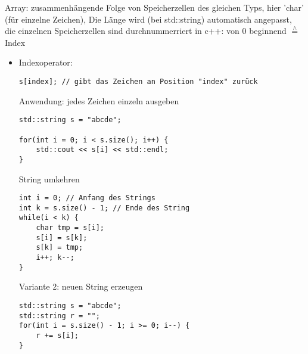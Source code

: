 \documentclass[a4paper]{scrartcl}
\newcommand{\estimates}{\overset{\scriptscriptstyle\wedge}{=}}%
\theoremstyle{definition}
\theoremstyle{plain}
\theoremstyle{remark}
\theoremstyle{remark}
\begin{document}
\begin{itemize}
\begin{itemize}
       Array: zusammenhängende Folge von Speicherzellen des gleichen Typs, hier 'char' (für einzelne Zeichen), Die Länge wird (bei std::string) automatisch angepasst, die einzelnen Speicherzellen sind durchnummerriert
in c++: von $0$ beginnend $\estimates$ Index
\begin{itemize}
\item Indexoperator:
\begin{verbatim}
s[index]; // gibt das Zeichen an Position "index" zurück
\end{verbatim}
Anwendung: jedes Zeichen einzeln ausgeben
\begin{verbatim}
std::string s = "abcde";

for(int i = 0; i < s.size(); i++) {
	std::cout << s[i] << std::endl;
}
\end{verbatim}
String umkehren
\begin{verbatim}
int i = 0; // Anfang des Strings
int k = s.size() - 1; // Ende des String
while(i < k) {
	char tmp = s[i];
	s[i] = s[k];
	s[k] = tmp;
	i++; k--;
}
\end{verbatim}
Variante 2: neuen String erzeugen
\begin{verbatim}
std::string s = "abcde";
std::string r = "";
for(int i = s.size() - 1; i >= 0; i--) {
	r += s[i];
}
\end{verbatim}
\end{itemize}
\end{itemize}
\end{itemize}
\end{document}
